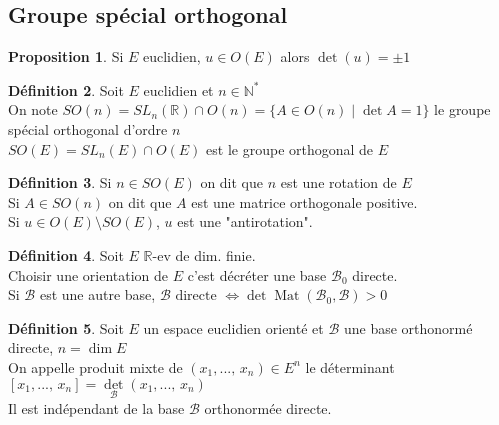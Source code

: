\documentclass[10pt,a4paper]{article}
\theoremstyle{definition}
\newtheorem{proposition}{Proposition}[section]
\newtheorem{definition}[proposition]{Définition}
\DeclareMathOperator*{\mat}{Mat}
\begin{document}
\subsection{Groupe spécial orthogonal}
\begin{proposition}
    Si \(E\) euclidien, \(u \in O(E)\) alors \(\det(u) = \pm 1\)
\end{proposition}
\begin{definition}
    Soit \(E\) euclidien et \(n \in \mathbb{N}^*\) \\
    On note \(SO(n) = SL_n(\mathbb{R}) \cap O(n) = \{A \in O(n) \mid \det A = 1\}\) le groupe spécial orthogonal d'ordre \(n\) \\
    \(SO(E) = SL_n(E) \cap O(E)\) est le groupe orthogonal de \(E\)
\end{definition}
\begin{definition}
    Si \(n \in SO(E)\) on dit que \(n\) est une rotation de \(E\) \\
    Si \(A \in SO(n)\) on dit que \(A\) est une matrice orthogonale positive. \\
    Si \(u \in O(E) \setminus SO(E)\), \(u\) est une "antirotation".
\end{definition}
\begin{definition}
    Soit \(E\) \(\mathbb{R}\)-ev de dim. finie. \\
    Choisir une orientation de \(E\) c'est décréter une base \(\mathcal{B}_0\) directe. \\
    Si \(\mathcal{B}\) est une autre base, \(\mathcal{B} \text{ directe } \iff \det \mat(\mathcal{B}_0, \mathcal{B}) > 0\)
\end{definition}
\begin{definition}
    Soit \(E\) un espace euclidien orienté et \(\mathcal{B}\) une base orthonormé directe, \(n = \dim E\) \\
    On appelle produit mixte de \((x_1, ...,\, x_n) \in E^n\) le déterminant \([x_1, ...,\, x_n] = \det\limits_{\mathcal{B}}(x_1, ...,\, x_n)\) \\
    Il est indépendant de la base \(\mathcal{B}\) orthonormée directe.
\end{definition}
\end{document}
